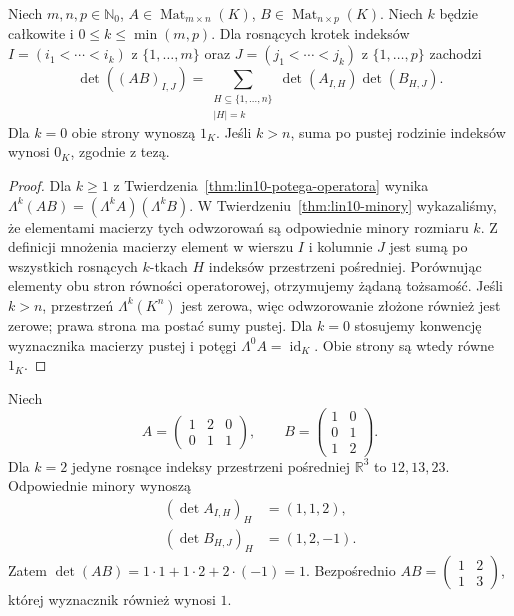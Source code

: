 \begin{wniosek}
\label{cor:lin10-cauchy-binet}
Niech \(m,n,p\in\mathbb N_0\),
\(A\in\operatorname{Mat}_{m\times n}(K)\),
\(B\in\operatorname{Mat}_{n\times p}(K)\).
Niech \(k\) będzie całkowite
i \(0\le k\le\min(m,p)\).
Dla rosnących krotek indeksów
\(I=(i_1<\cdots<i_k)\)
z \(\{1,\ldots,m\}\) oraz
\(J=(j_1<\cdots<j_k)\)
z \(\{1,\ldots,p\}\)
zachodzi
\[
 \det((AB)_{I,J})
 =\sum_{\substack{H\subseteq\{1,\ldots,n\}\\|H|=k}}
     \det(A_{I,H})\det(B_{H,J}).
\]
Dla \(k=0\) obie strony
wynoszą \(1_K\).
Jeśli \(k>n\), suma po
pustej rodzinie indeksów
wynosi \(0_K\), zgodnie z tezą.
\end{wniosek}
\begin{proof}
Dla \(k\ge1\) z
Twierdzenia~\ref{thm:lin10-potega-operatora}
wynika
\(\Lambda^k(AB)=(\Lambda^k A)(\Lambda^k B)\).
W
Twierdzeniu~\ref{thm:lin10-minory}
wykazaliśmy, że
elementami macierzy
tych odwzorowań są odpowiednie
minory rozmiaru \(k\).
Z definicji mnożenia
macierzy element w
wierszu \(I\) i kolumnie
\(J\) jest sumą po wszystkich
rosnących \(k\)-tkach \(H\)
indeksów przestrzeni pośredniej.
Porównując elementy obu
stron równości operatorowej,
otrzymujemy żądaną tożsamość.
Jeśli \(k>n\), przestrzeń
\(\Lambda^k(K^n)\) jest zerowa,
więc odwzorowanie złożone
również jest zerowe; prawa
strona ma postać sumy pustej.
Dla \(k=0\) stosujemy konwencję
wyznacznika macierzy pustej
i potęgi \(\Lambda^0 A=\operatorname{id}_K\).
Obie strony są wtedy równe \(1_K\).
\end{proof}

\begin{przyklad}
\label{prz:lin10-cauchy}
Niech
\[
 A=\begin{pmatrix}1&2&0\\0&1&1\end{pmatrix},
 \qquad
 B=\begin{pmatrix}1&0\\0&1\\1&2\end{pmatrix}.
\]
Dla \(k=2\) jedyne
rosnące indeksy przestrzeni
pośredniej \(\mathbb R^3\)
to \(12,13,23\).
Odpowiednie minory wynoszą
\[
 \begin{aligned}
 (\det A_{I,H})_H&=(1,1,2),\\
 (\det B_{H,J})_H&=(1,2,-1).
 \end{aligned}
\]
Zatem
\(\det(AB)=1\cdot1+1\cdot2+
2\cdot(-1)=1\).
Bezpośrednio
\(AB=\begin{pmatrix}1&2\\1&3\end{pmatrix}\),
której wyznacznik również
wynosi \(1\).
\end{przyklad}

